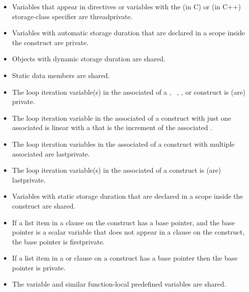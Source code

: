\begin{ccppspecific}
\begin{itemize}
\item Variables that appear in  directives or
      variables with the  (in C) or
       (in C++) storage-class specifier are threadprivate. 
\item Variables with automatic storage duration that are declared in a scope 
      inside the construct are private.
\item Objects with dynamic storage duration are shared.
\item Static data members are shared.
\item The loop iteration variable(s) in the associated  of a
      , ~, , or 
       construct is (are) private.
\item The loop iteration variable in the associated  of a
       construct with just one associated  is 
      linear with a  that is the increment 
      of the associated .
\item The loop iteration variables in the associated  of a
       construct with multiple associated  are lastprivate.
\item The loop iteration variable(s) in the associated  of a
       construct is (are) lastprivate.
\item Variables with static storage duration that are declared in a scope 
      inside the construct are shared.
\item If a list item in a  clause on the  construct 
      has a base pointer, and the base pointer is a scalar variable that 
      does not appear in a  clause on the construct, the base 
      pointer is firstprivate.
\item If a list item in a  or  clause on a
      construct has a base pointer then the base pointer is private.
\item The  variable and similar function-local
      predefined variables are shared.
\end{itemize}
\end{ccppspecific}

